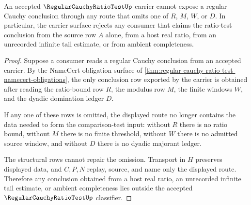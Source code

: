 \begin{theorem}
\label{thm:regular-cauchy-ratio-test-nonescape}
An accepted $\RegularCauchyRatioTestUp$ carrier cannot expose a regular Cauchy conclusion through any route that omits one of $R$, $M$, $W$, or $D$. In particular, the carrier surface rejects any consumer that claims the ratio-test conclusion from the source row $A$ alone, from a host real ratio, from an unrecorded infinite tail estimate, or from ambient completeness.
\end{theorem}
\begin{proof}
Suppose a consumer reads a regular Cauchy conclusion from an accepted carrier. By the NameCert obligation surface of \autoref{thm:regular-cauchy-ratio-test-namecert-obligations}, the only conclusion row exported by the carrier is obtained after reading the ratio-bound row $R$, the modulus row $M$, the finite windows $W$, and the dyadic domination ledger $D$.

If any one of these rows is omitted, the displayed route no longer contains the data needed to form the comparison-test input: without $R$ there is no ratio bound, without $M$ there is no finite threshold, without $W$ there is no admitted source window, and without $D$ there is no dyadic majorant ledger.

The structural rows cannot repair the omission. Transport in $H$ preserves displayed data, and $C,P,N$ replay, source, and name only the displayed route. Therefore any conclusion obtained from a host real ratio, an unrecorded infinite tail estimate, or ambient completeness lies outside the accepted $\RegularCauchyRatioTestUp$ classifier.
\end{proof}




